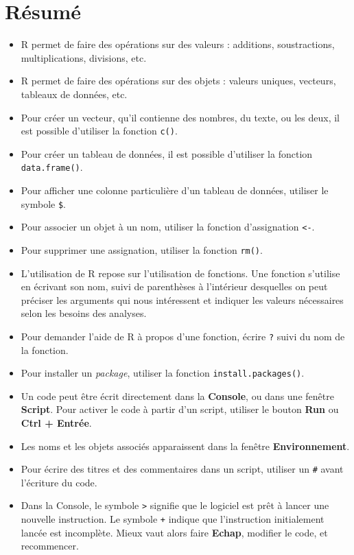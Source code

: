 \documentclass[
  french,
]{book}
\providecommand{\tightlist}{%
  \setlength{\itemsep}{0pt}\setlength{\parskip}{0pt}}
\begin{document}
\hypertarget{ruxe9sumuxe9}{%
\section{Résumé}\label{ruxe9sumuxe9}}

\begin{itemize}
\tightlist
\item
  R permet de faire des opérations sur des valeurs : additions, soustractions, multiplications, divisions, etc.
\item
  R permet de faire des opérations sur des objets : valeurs uniques, vecteurs, tableaux de données, etc.
\item
  Pour créer un vecteur, qu'il contienne des nombres, du texte, ou les deux, il est possible d'utiliser la fonction \texttt{c()}.
\item
  Pour créer un tableau de données, il est possible d'utiliser la fonction \texttt{data.frame()}.
\item
  Pour afficher une colonne particulière d'un tableau de données, utiliser le symbole \texttt{\$}.
\item
  Pour associer un objet à un nom, utiliser la fonction d'assignation \texttt{\textless{}-}.
\item
  Pour supprimer une assignation, utiliser la fonction \texttt{rm()}.
\item
  L'utilisation de R repose sur l'utilisation de fonctions. Une fonction s'utilise en écrivant son nom, suivi de parenthèses à l'intérieur desquelles on peut préciser les arguments qui nous intéressent et indiquer les valeurs nécessaires selon les besoins des analyses.
\item
  Pour demander l'aide de R à propos d'une fonction, écrire \texttt{?} suivi du nom de la fonction.
\item
  Pour installer un \emph{package}, utiliser la fonction \texttt{install.packages()}.
\item
  Un code peut être écrit directement dans la \textbf{Console}, ou dans une fenêtre \textbf{Script}. Pour activer le code à partir d'un script, utiliser le bouton \textbf{Run} ou \textbf{Ctrl + Entrée}.
\item
  Les noms et les objets associés apparaissent dans la fenêtre \textbf{Environnement}.
\item
  Pour écrire des titres et des commentaires dans un script, utiliser un \texttt{\#} avant l'écriture du code.
\item
  Dans la Console, le symbole \texttt{\textgreater{}} signifie que le logiciel est prêt à lancer une nouvelle instruction. Le symbole \texttt{+} indique que l'instruction initialement lancée est incomplète. Mieux vaut alors faire \textbf{Echap}, modifier le code, et recommencer.
\end{itemize}
\end{document}
